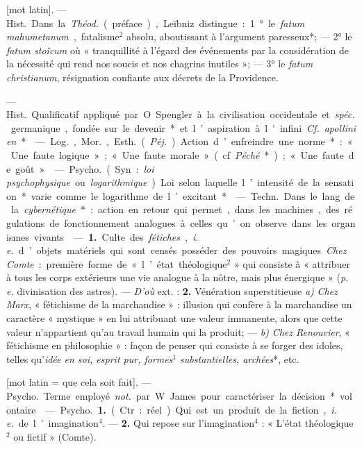 \begin{itemize}[leftmargin=1cm, label=, itemsep=1pt]
 [mot latin]. — \si{Hist.} Dans la
{\it Théod.} (préface), Leïbniz distingue : 1° le {\it fatum mahumetanum},
fatalisme$^2$ absolu, aboutissant à l’argument paresseux*; — 2° le {\it fatum
stoïcum} où « tranquillité à l'égard des événements par la
considération de la nécessité qui
rend nos soucis et nos chagrins inutiles »; — 3° le {\it fatum christianum},
résignation confiante aux décrets de
la Providence.

 — \si{Hist.} Qualificatif appliqué par O. Spengler à la
civilisation occidentale et {\it spéc.} germanique, fondée sur le devenir*
et l’aspiration à l'infini. {\it Cf.} {\it apollinien}*.

 — \si{Log.}, \si{Mor.}, \si{Esth.} ({\it Péj.}) Action
d’enfreindre une norme* : « Une faute logique »; « Une faute morale »
(cf. {\it Péché}*); « Une faute de goût ».

 — \si{Psycho.} (Syn. :
{\it loi psychophysique} ou {\it logarithmique}).
Loi selon laquelle l’intensité de la
sensation* varie comme le logarithme de l’excitant*.

 — \si{Techn.} Dans le lang. de
la {\it cybernétique}* : action en retour
qui permet, dans les machines, des
régulations de fonctionnement analogues à celles qu’on observe dans
les organismes vivants.

 — {\bf 1.} Culte des {\it fétiches},
{\it i. e.} d’objets matériels qui sont
censés posséder des pouvoirs magiques. {\it Chez Comte} : première forme
de « l’état théologique$^2$ » qui consiste
à « attribuer à tous les corps extérieurs une vie analogue à la nôtre,
mais plus énergique » ({\it p. e.} divinisation des astres). — {\it D'où} ext. :
{\bf 2.} Vénération superstitieuse {\it a)} {\it Chez Marx}, « fétichisme de la
marchandise » : illusion qui confère à la marchandise un caractère
« mystique » en lui attribuant une valeur immanente, alors que cette valeur
n’appartient qu'au travail humain qui la produit; — {\it b)} {\it Chez Renouvier},
« fétichisme en philosophie » : façon de penser qui consiste à se forger
des idoles, telles qu’{\it idée en soi, esprit pur, formes$^1$ substantielles,
archées}*, etc.

 [mot latin = que cela soit fait]. — \si{Psycho.} Terme employé
{\it not.} par W. James pour caractériser la décision* volontaire.

 — \si{Psycho.} {\bf 1.} (Ctr. : réel). Qui est un produit de la
fiction, {\it i. e.} de l’imagination$^4$. — {\bf 2.} Qui repose sur
l'imagination$^4$ : « L'état théologique$^2$ ou fictif » (Comte).


\end{itemize}
